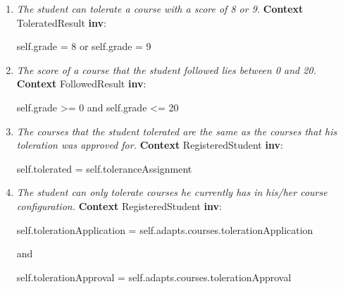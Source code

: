 \begin{enumerate}
	
	\item \emph{The student can tolerate a course with a score of 8 or 9.}
	\npar \textbf{Context} ToleratedResult \textbf{inv}:
	\par \hspace*{5 mm} self.grade = 8 or self.grade = 9
	
	\item \emph{The score of a course that the student followed lies between 0 and
	20.}
	\npar \textbf{Context} FollowedResult \textbf{inv}:
	\par \hspace*{5 mm} self.grade >= 0 and self.grade <= 20
	
	\item \emph{The courses that the student tolerated are the same as the courses
	that his toleration was approved for.}
	\npar \textbf{Context} RegisteredStudent \textbf{inv}:
	\par \hspace*{5 mm} self.tolerated = self.toleranceAssignment
	
	\item \emph{The student can only tolerate courses he currently has in his/her
	course configuration.} 
	\npar \textbf{Context} RegisteredStudent \textbf{inv}:
	\par \hspace*{5 mm} self.tolerationApplication =
	self.adapts.courses.tolerationApplication
	\par \hspace*{10 mm} and
	\par \hspace*{5 mm} self.tolerationApproval =
	self.adapts.courses.tolerationApproval
	

\end{enumerate}
